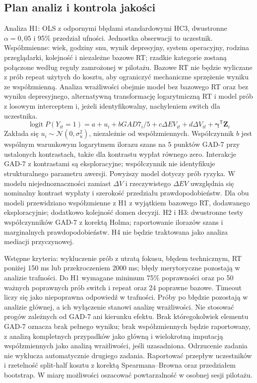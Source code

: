 \documentclass[11pt,a4paper]{article}
\begin{document}
\subsection{Plan analiz i kontrola jakości}
Analiza H1: OLS z odpornymi błędami standardowymi HC3, dwustronne $\alpha=0{,}05$ i 95\% przedział ufności. Jednostka obserwacji to uczestnik. Współzmienne: wiek, godziny snu, wynik depresyjny, system operacyjny, rodzina przeglądarki, kolejność i niezależne bazowe RT; rzadkie kategorie zostaną połączone według reguły zamrożonej w pilotażu. Bazowe RT nie będzie wyliczane z prób repeat użytych do kosztu, aby ograniczyć mechaniczne sprzężenie wyniku ze współzmienną. Analiza wrażliwości obejmie model bez bazowego RT oraz bez wyniku depresyjnego, alternatywną transformację logarytmiczną RT i model prób z losowym interceptem i, jeżeli identyfikowalny, nachyleniem switch dla uczestnika.
\begin{equation}
\operatorname{logit}P(Y_{it}=1)=a+u_i+bGAD7_i/5+c\Delta EV_{it}+d\Delta V_{it}+\boldsymbol{\gamma}^{\mathsf T}\mathbf Z_i
\end{equation}
Zakłada się $u_i\sim\mathcal N(0,\sigma_u^2)$, niezależnie od współzmiennych. Współczynnik $b$ jest wspólnym warunkowym logarytmem ilorazu szans na 5 punktów GAD-7 przy ustalonych kontrastach, także dla kontrastu wypłat równego zero. Interakcje GAD-7 z kontrastami są eksploracyjne; współczynnik nie identyfikuje strukturalnego parametru awersji. Powyższy model dotyczy prób ryzyka. W modelu niejednoznaczności zamiast $\Delta V$ i rzeczywistego $\Delta EV$ uwzględnia się nominalny kontrast wypłaty i szerokość przedziału prawdopodobieństw. Dla obu modeli przewidziano współzmienne z H1 z wyjątkiem bazowego RT, dodawanego eksploracyjnie; dodatkowo kolejność domen decyzji. H2 i H3: dwustronne testy współczynników GAD-7 z korektą Holma; raportowanie ilorazów szans i marginalnych prawdopodobieństw. H4 nie będzie traktowana jako analiza mediacji przyczynowej.

Wstępne kryteria: wykluczenie prób z utratą fokusu, błędem technicznym, RT poniżej 150 ms lub przekroczeniem 2000 ms; błędy merytoryczne pozostają w analizie trafności. Do H1 wymagane minimum 75\% poprawności oraz po 50 ważnych poprawnych prób switch i repeat oraz 24 poprawne bazowe. Timeout liczy się jako niepoprawna odpowiedź w trafności. Próby po błędzie pozostają w analizie głównej, a ich wyłączenie stanowi analizę wrażliwości. Nie stosować progów zależnych od GAD-7 ani kierunku efektu. Brak któregokolwiek elementu GAD-7 oznacza brak pełnego wyniku; brak współzmiennych będzie raportowany, z analizą kompletnych przypadków jako główną i wielokrotną imputacją współzmiennych jako analizą wrażliwości, jeśli uzasadniona. Odrzucenie zadania nie wyklucza automatycznie drugiego zadania. Raportować przepływ uczestników i rzetelność split-half kosztu z korektą Spearmana--Browna oraz przedziałem bootstrap. W miarę możliwości oszacować powtarzalność w osobnej sesji pilotażu.
\end{document}
